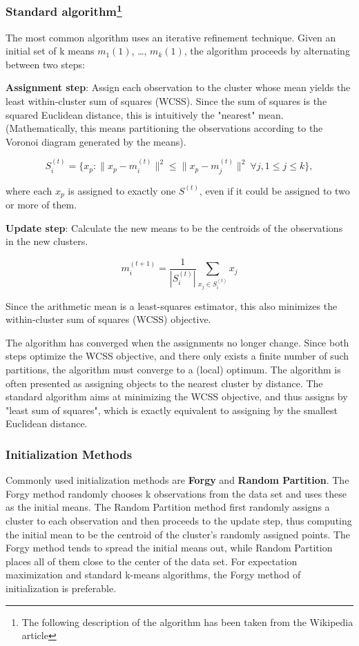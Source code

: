 \documentclass[oneside, a4paper, 11pt]{book}
\begin{document}
\subsubsection{Standard algorithm\protect\footnote{The following description of the algorithm has been taken from the Wikipedia article}}
The most common algorithm uses an iterative refinement technique.
Given an initial set of k means $m_1(1)$, \ldots, $m_k(1)$, the algorithm proceeds by alternating between two steps:

\textbf{Assignment step}: Assign each observation to the cluster whose mean yields the least within-cluster sum of squares (WCSS). Since the sum of squares is the squared Euclidean distance, this is intuitively the "nearest" mean. (Mathematically, this means partitioning the observations according to the Voronoi diagram generated by the means).

$$S_i^{(t)} = \big \{ x_p : \big \| x_p - m^{(t)}_i \big \|^2 \le \big \| x_p - m^{(t)}_j \big \|^2 \ \forall j, 1 \le j \le k \big\},$$

where each $x_p$ is assigned to exactly one $S^{(t)}$, even if it could be assigned to two or more of them.

\textbf{Update step}: Calculate the new means to be the centroids of the observations in the new clusters.

$$m^{(t+1)}_i = \frac{1}{|S^{(t)}_i|} \sum_{x_j \in S^{(t)}_i} x_j$$

Since the arithmetic mean is a least-squares estimator, this also minimizes the within-cluster sum of squares (WCSS) objective.


The algorithm has converged when the assignments no longer change. Since both steps optimize the WCSS objective, and there only exists a finite number of such partitions, the algorithm must converge to a (local) optimum. The algorithm is often presented as assigning objects to the nearest cluster by distance. The standard algorithm aims at minimizing the WCSS objective, and thus assigns by "least sum of squares", which is exactly equivalent to assigning by the smallest Euclidean distance.


\subsubsection{Initialization Methods}
Commonly used initialization methods are \textbf{Forgy} and \textbf{Random Partition}\cite{hamerly}. The Forgy method randomly chooses k observations from the data set and uses these as the initial means. The Random Partition method first randomly assigns a cluster to each observation and then proceeds to the update step, thus computing the initial mean to be the centroid of the cluster's randomly assigned points. The Forgy method tends to spread the initial means out, while Random Partition places all of them close to the center of the data set. For expectation maximization and standard k-means algorithms, the Forgy method of initialization is preferable.
\end{document}
